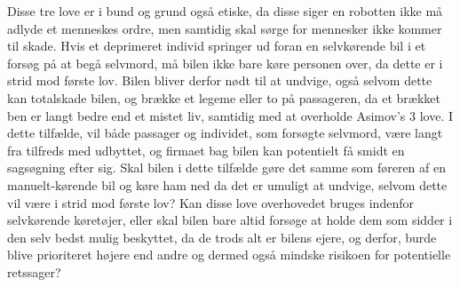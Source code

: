 	Disse tre love er i bund og grund også etiske, da disse siger en robotten ikke må adlyde et menneskes ordre, men samtidig skal sørge for mennesker ikke kommer til skade. Hvis et deprimeret individ springer ud foran en selvkørende bil i et forsøg på at begå selvmord, må bilen ikke bare køre personen over, da dette er i strid mod første lov. Bilen bliver derfor nødt til at undvige, også selvom dette kan totalskade bilen, og brække et legeme eller to på passageren, da et brækket ben er langt bedre end et mistet liv, samtidig med at overholde Asimov's 3 love. I dette tilfælde, vil både passager og individet, som forsøgte selvmord, være langt fra tilfreds med udbyttet, og firmaet bag bilen kan potentielt få smidt en sagsøgning efter sig. Skal bilen i dette tilfælde gøre det samme som føreren af en manuelt-kørende bil og køre ham ned da det er umuligt at undvige, selvom dette vil være i strid mod første lov? Kan disse love overhovedet bruges indenfor selvkørende køretøjer, eller skal bilen bare altid forsøge at holde dem som sidder i den selv bedst mulig beskyttet, da de trods alt er bilens ejere, og derfor, burde blive prioriteret højere end andre og dermed også mindske risikoen for potentielle retssager? 